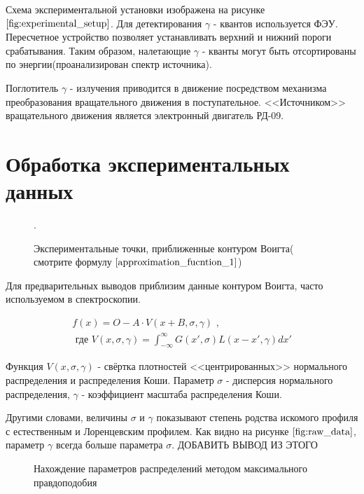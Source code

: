 \documentclass[a4paper, 14pt]{article}
\begin{document}
Схема экспериментальной установки изображена на рисунке $\ref{fig:experimental_setup}$.
Для детектирования $\gamma$ - квантов используется ФЭУ. Пересчетное устройство позволяет
устанавливать верхний и нижний пороги срабатывания. Таким образом, налетающие $\gamma$ - кванты
могут быть отсортированы по энергии(проанализирован спектр источника).

Поглотитель $\gamma$ - излучения приводится в движение посредством механизма преобразования
вращательного движения в поступательное. <<Источником>> вращательного движения является
электронный двигатель РД-09.






\section*{\textcolor{header}{Обработка экспериментальных данных}}

\begin{figure}[hbtp]
    \begin{center}
        
    \end{center}
    \caption{Экспериментальные точки, приближенные контуром Воигта( смотрите формулу $\ref{approximation_fucntion_1}$)}.
    \label{fig:raw_data}
\end{figure}

Для предварительных выводов приблизим данные контуром Воигта, часто
используемом в спектроскопии.

\begin{equation}
    \begin{aligned}
        f(x) = O - A \cdot V(x + B, \sigma, \gamma) \text{ ,} \\
        \text{ где } V(x, \sigma, \gamma) = \int_{- \infty}^{\infty} G(x', \sigma) L(x - x', \gamma) dx'
    \end{aligned}
    \label{approximation_fucntion_1}
\end{equation}

Функция $V(x, \sigma, \gamma)$ - свёртка плотностей <<центрированных>> нормального распределения и распределения Коши.
Параметр $\sigma$ - дисперсия нормального распределения, $\gamma$ - коэффициент масштаба распределения Коши.

Другими словами, величины $\sigma$ и $\gamma$ показывают степень родства искомого профиля с естественным и Лоренцевским профилем.
Как видно на рисунке $\ref{fig:raw_data}$, параметр $\gamma$ всегда больше параметра $\sigma$. ДОБАВИТЬ ВЫВОД ИЗ ЭТОГО
\begin{figure}[hbtp]
    
    \caption{Нахождение параметров распределений методом максимального правдоподобия}
\end{figure}
\end{document}
